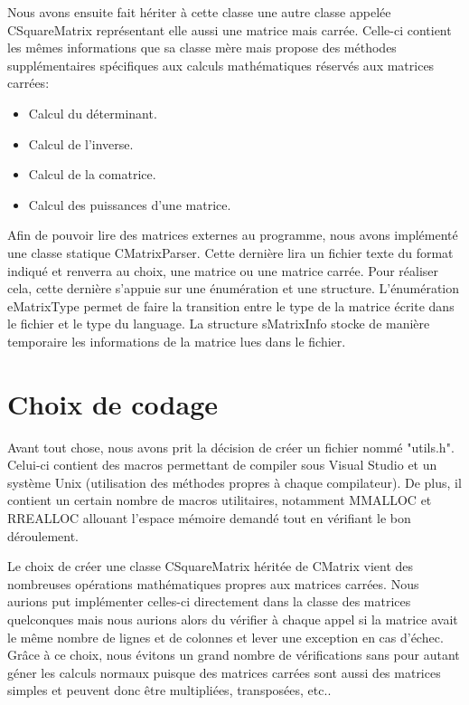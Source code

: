 		Nous avons ensuite fait hériter à cette classe une autre classe appelée CSquareMatrix représentant elle aussi une matrice mais carrée. Celle-ci contient les mêmes informations que sa classe mère mais propose des méthodes supplémentaires spécifiques aux calculs mathématiques réservés aux matrices carrées:
		\begin{itemize}
			\item Calcul du déterminant.
			\item Calcul de l'inverse.
			\item Calcul de la comatrice.
			\item Calcul des puissances d'une matrice.\\
		\end{itemize}
		
		Afin de pouvoir lire des matrices externes au programme, nous avons implémenté une classe statique CMatrixParser. Cette dernière lira un fichier texte du format indiqué et renverra au choix, une matrice ou une matrice carrée. Pour réaliser cela, cette dernière s'appuie sur une énumération et une structure. L'énumération eMatrixType permet de faire la transition entre le type de la matrice écrite dans le fichier et le type du language. La structure sMatrixInfo stocke de manière temporaire les informations de la matrice lues dans le fichier. 
		
	\chapter{Choix de codage}
		Avant tout chose, nous avons prit la décision de créer un fichier nommé "utils.h". Celui-ci contient des macros permettant de compiler sous Visual Studio et un système Unix (utilisation des méthodes propres à chaque compilateur). De plus, il contient un certain nombre de macros utilitaires, notamment MMALLOC et RREALLOC allouant l'espace mémoire demandé tout en vérifiant le bon déroulement.
	
		Le choix de créer une classe CSquareMatrix héritée de CMatrix vient des nombreuses opérations mathématiques propres aux matrices carrées. Nous aurions put implémenter celles-ci directement dans la classe des matrices quelconques mais nous aurions alors du vérifier à chaque appel si la matrice avait le même nombre de lignes et de colonnes et lever une exception en cas d'échec.
		Grâce à ce choix, nous évitons un grand nombre de vérifications sans pour autant géner les calculs normaux puisque des matrices carrées sont aussi des matrices simples et peuvent donc être multipliées, transposées, etc..
		
